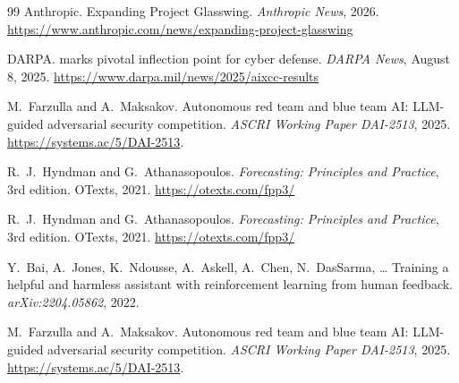 \documentclass[conference]{IEEEtran}
\begin{document}
\begin{thebibliography}{99}
Anthropic.
\newblock Expanding Project Glasswing.
\newblock \emph{Anthropic News}, 2026.
\newblock \url{https://www.anthropic.com/news/expanding-project-glasswing}

DARPA.
 marks pivotal inflection point for cyber defense.
\newblock \emph{DARPA News}, August 8, 2025.
\newblock \url{https://www.darpa.mil/news/2025/aixcc-results}

M.~Farzulla and A.~Maksakov.
\newblock Autonomous red team and blue team {AI}: {LLM}-guided adversarial security competition.
\newblock \emph{ASCRI Working Paper DAI-2513}, 2025.
\newblock \url{https://systems.ac/5/DAI-2513}.

R.~J.~Hyndman and G.~Athanasopoulos.
\newblock \emph{Forecasting: Principles and Practice}, 3rd edition.
\newblock OTexts, 2021.
\newblock \url{https://otexts.com/fpp3/}

R.~J.~Hyndman and G.~Athanasopoulos.
\newblock \emph{Forecasting: Principles and Practice}, 3rd edition.
\newblock OTexts, 2021.
\newblock \url{https://otexts.com/fpp3/}

Y.~Bai, A.~Jones, K.~Ndousse, A.~Askell, A.~Chen, N.~DasSarma, \ldots{}
\newblock Training a helpful and harmless assistant with reinforcement learning from human feedback.
\newblock \emph{arXiv:2204.05862}, 2022.

M.~Farzulla and A.~Maksakov.
\newblock Autonomous red team and blue team {AI}: {LLM}-guided adversarial security competition.
\newblock \emph{ASCRI Working Paper DAI-2513}, 2025.
\newblock \url{https://systems.ac/5/DAI-2513}.

\end{thebibliography}
\end{document}
